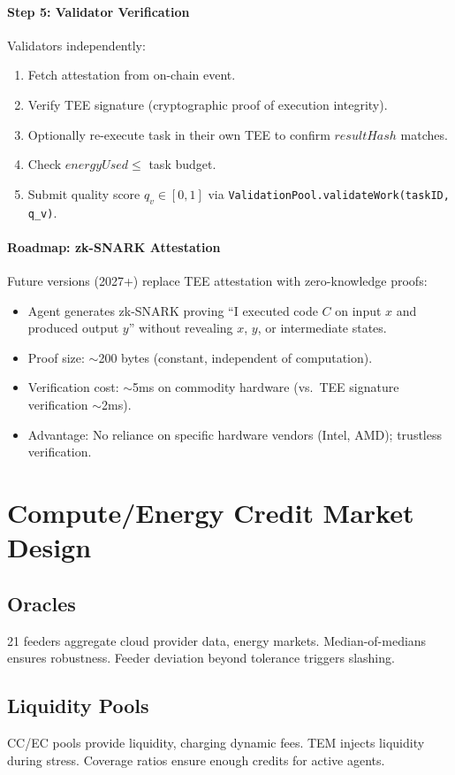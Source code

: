 \documentclass[11pt]{article}
\begin{document}
\paragraph{Step 5: Validator Verification}
Validators independently:
\begin{enumerate}[noitemsep]
  \item Fetch attestation from on-chain event.
  \item Verify TEE signature (cryptographic proof of execution integrity).
  \item Optionally re-execute task in their own TEE to confirm $resultHash$ matches.
  \item Check $energyUsed \leq$ task budget.
  \item Submit quality score $q_v \in [0,1]$ via \texttt{ValidationPool.validateWork(taskID, q\_v)}.
\end{enumerate}

\paragraph{Roadmap: zk-SNARK Attestation}
Future versions (2027+) replace TEE attestation with zero-knowledge proofs:
\begin{itemize}[noitemsep]
  \item Agent generates zk-SNARK proving ``I executed code $C$ on input $x$ and produced output $y$'' without revealing $x$, $y$, or intermediate states.
  \item Proof size: $\sim$200 bytes (constant, independent of computation).
  \item Verification cost: $\sim$5ms on commodity hardware (vs.\ TEE signature verification $\sim$2ms).
  \item Advantage: No reliance on specific hardware vendors (Intel, AMD); trustless verification.
\end{itemize}

\section{Compute/Energy Credit Market Design}
\subsection{Oracles}
21 feeders aggregate cloud provider data, energy markets. Median-of-medians ensures robustness. Feeder deviation beyond tolerance triggers slashing.

\subsection{Liquidity Pools}
CC/EC pools provide liquidity, charging dynamic fees. TEM injects liquidity during stress. Coverage ratios ensure enough credits for active agents.
\end{document}
